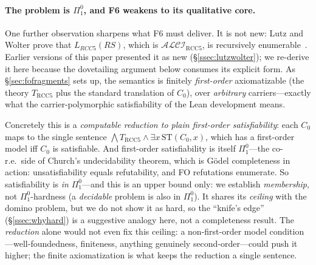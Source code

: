 \documentclass[11pt]{article}
\newcommand{\ALCIRCC}[1]{\mathcal{ALCI}_{\mathrm{RCC#1}}}
\newcommand{\LRCC}[1]{\ensuremath{L_{\mathit{RCC#1}}}}
\theoremstyle{plain}
\theoremstyle{definition}
\begin{document}
\paragraph{The problem is $\Pi^0_1$, and F6 weakens to its qualitative
core.} One further observation sharpens what F6 must deliver. It is not
new: Lutz and Wolter prove that $\LRCC{5}(\mathit{RS})$, which is
$\ALCIRCC{5}$, is recursively enumerable~\cite[Thm.~28]{LutzWolter2006}.
Earlier versions of this paper presented it as new
(\S\ref{ssec:lutzwolter}); we re-derive it here because the dovetailing
argument below consumes its explicit form. As \S\ref{sec:fofragments} sets up, the semantics is finitely
\emph{first-order} axiomatizable (the theory $T_{\mathrm{RCC5}}$ plus the
standard translation of $C_0$), over \emph{arbitrary} carriers---exactly what
the carrier-polymorphic satisfiability of the Lean development means.

Concretely this is a \emph{computable reduction to plain first-order
satisfiability}: each $C_0$ maps to the single sentence $\bigwedge
T_{\mathrm{RCC5}}\wedge\exists x\,\mathrm{ST}(C_0,x)$, which has a first-order
model iff $C_0$ is satisfiable. And first-order satisfiability is itself
$\Pi^0_1$---the co-r.e.\ side of Church's undecidability theorem, which is
G\"odel completeness in action: unsatisfiability equals refutability, and FO
refutations enumerate. So satisfiability is \emph{in} $\Pi^0_1$---and this is
an upper bound only: we establish \emph{membership}, not $\Pi^0_1$-hardness
(a \emph{decidable} problem is also in $\Pi^0_1$). It shares its
\emph{ceiling} with the domino problem, but we do not show it as hard, so the
``knife's edge'' (\S\ref{ssec:whyhard}) is a suggestive analogy here, not a
completeness result. The \emph{reduction} alone would not even fix this
ceiling: a non-first-order model condition---well-foundedness, finiteness,
anything genuinely second-order---could push it higher; the finite
axiomatization is what keeps the reduction a single sentence.
\end{document}
